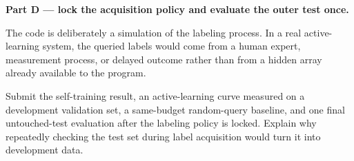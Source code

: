 

\textbf{Part D --- lock the acquisition policy and evaluate the outer test once.}




\begin{keyidea}
The code is deliberately a simulation of the labeling process. In a real active-learning system, the queried labels would come from a human expert, measurement process, or delayed outcome rather than from a hidden array already available to the program.
\end{keyidea}

\begin{labdeliverable}
Submit the self-training result, an active-learning curve measured on a development validation set, a same-budget random-query baseline, and one final untouched-test evaluation after the labeling policy is locked. Explain why repeatedly checking the test set during label acquisition would turn it into development data.
\end{labdeliverable}
